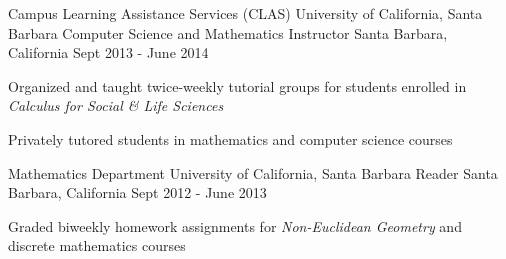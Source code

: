 \begin{cventries}
  \cventry
{Campus Learning Assistance Services (CLAS) \newline University of California, Santa Barbara}
    {Computer Science and Mathematics Instructor}
    {Santa Barbara, California}
    {Sept 2013 - June 2014}
    {
      \begin{cvitems}
	\item {Organized and taught twice-weekly tutorial groups for students enrolled in \emph{Calculus for Social \& Life Sciences}}
        \item {Privately tutored students in mathematics and computer science courses}
      \end{cvitems}
    }

  \cventry
{Mathematics Department \newline University of California, Santa Barbara}
    {Reader}
    {Santa Barbara, California}
    {Sept 2012 - June 2013}
    {
      \begin{cvitems}
	\item {Graded biweekly homework assignments for \emph{Non-Euclidean Geometry} and discrete mathematics courses}
      \end{cvitems}
    }



  \end{cventries}
